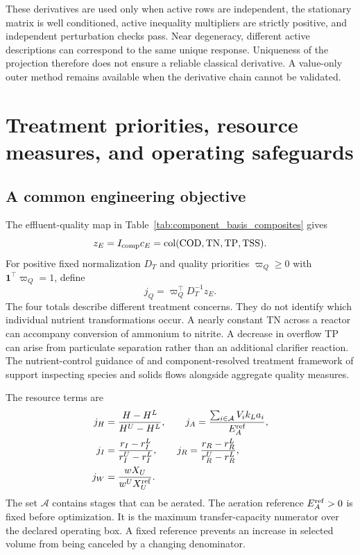 These derivatives are used only when active rows are independent, the stationary matrix is well conditioned, active inequality multipliers are strictly positive, and independent perturbation checks pass. Near degeneracy, different active descriptions can correspond to the same unique response. Uniqueness of the projection therefore does not ensure a reliable classical derivative. A value-only outer method remains available when the derivative chain cannot be validated.

\section{Treatment priorities, resource measures, and operating safeguards}

\subsection{A common engineering objective}

The effluent-quality map in Table~\ref{tab:component_basis_composites} gives
\begin{equation}
z_E=I_{\rm comp}c_E=\operatorname{col}(\mathrm{COD},\mathrm{TN},\mathrm{TP},\mathrm{TSS}).
\end{equation}
For positive fixed normalization $D_T$ and quality priorities $\varpi_Q\ge0$ with $\mathbf1^\top\varpi_Q=1$, define
\begin{equation}
j_Q=\varpi_Q^\top D_T^{-1}z_E.
\label{eq:plant_quality_objective}
\end{equation}
The four totals describe different treatment concerns. They do not identify which individual nutrient transformations occur. A nearly constant TN across a reactor can accompany conversion of ammonium to nitrite. A decrease in overflow TP can arise from particulate separation rather than an additional clarifier reaction. The nutrient-control guidance of \citet{USEPA2009} and component-resolved treatment framework of \citet{Zhang2026} support inspecting species and solids flows alongside aggregate quality measures.

The resource terms are
\begin{align}
j_H&=\frac{H-H^L}{H^U-H^L},\qquad
j_A=\frac{\sum_{i\in\mathcal A}V_i k_La_i}{E_A^{\rm ref}},\\
j_I&=\frac{r_I-r_I^L}{r_I^U-r_I^L},\qquad
j_R=\frac{r_R-r_R^L}{r_R^U-r_R^L},\\
j_W&=\frac{wX_U}{w^UX_U^{\rm ref}}.
\label{eq:plant_resource_objective}
\end{align}
The set $\mathcal A$ contains stages that can be aerated. The aeration reference $E_A^{\rm ref}>0$ is fixed before optimization. It is the maximum transfer-capacity numerator over the declared operating box. A fixed reference prevents an increase in selected volume from being canceled by a changing denominator.

